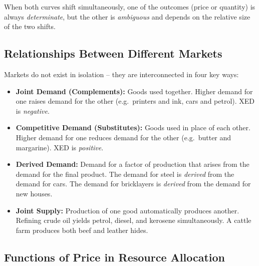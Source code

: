 \documentclass[11pt, a4paper, twoside]{book}
\begin{document}
When both curves shift simultaneously, one of the outcomes (price or quantity) is always \emph{determinate}, but the other is \emph{ambiguous} and depends on the relative size of the two shifts.

\subsection{Relationships Between Different Markets}

Markets do not exist in isolation -- they are interconnected in four key ways:

\begin{itemize}
  \item \textbf{Joint Demand (Complements):} Goods used together. Higher demand for one raises demand for the other (e.g.\ printers and ink, cars and petrol). XED is \emph{negative}.
  \item \textbf{Competitive Demand (Substitutes):} Goods used in place of each other. Higher demand for one reduces demand for the other (e.g.\ butter and margarine). XED is \emph{positive}.
  \item \textbf{Derived Demand:} Demand for a factor of production that arises from the demand for the final product. The demand for steel is \emph{derived} from the demand for cars. The demand for bricklayers is \emph{derived} from the demand for new houses.
  \item \textbf{Joint Supply:} Production of one good automatically produces another. Refining crude oil yields petrol, diesel, and kerosene simultaneously. A cattle farm produces both beef and leather hides.
\end{itemize}

\subsection{Functions of Price in Resource Allocation}
\end{document}

